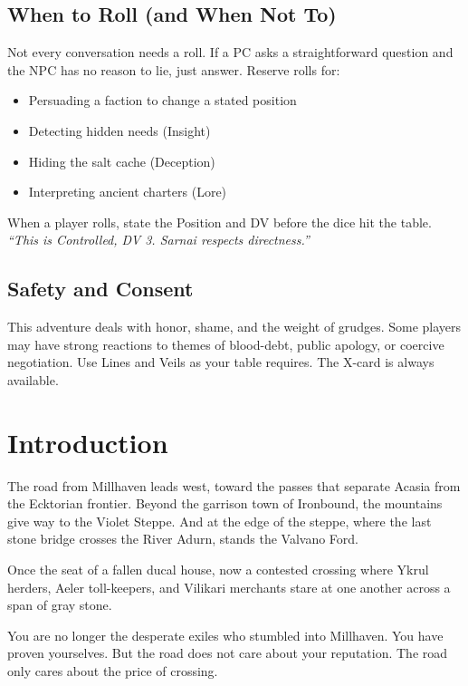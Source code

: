 \documentclass[10pt,twoside]{book}
\begin{document}
\section*{When to Roll (and When Not To)}

Not every conversation needs a roll. If a PC asks a straightforward question and the NPC has no reason to lie, just answer. Reserve rolls for:

\begin{itemize}
\item Persuading a faction to change a stated position
\item Detecting hidden needs (Insight)
\item Hiding the salt cache (Deception)
\item Interpreting ancient charters (Lore)
\end{itemize}

When a player rolls, state the Position and DV before the dice hit the table. \textit{``This is Controlled, DV 3. Sarnai respects directness.''}

\section*{Safety and Consent}

This adventure deals with honor, shame, and the weight of grudges. Some players may have strong reactions to themes of blood-debt, public apology, or coercive negotiation. Use Lines and Veils as your table requires. The X-card is always available.

\chapter*{Introduction}

The road from Millhaven leads west, toward the passes that separate Acasia from the Ecktorian frontier. Beyond the garrison town of Ironbound, the mountains give way to the Violet Steppe. And at the edge of the steppe, where the last stone bridge crosses the River Adurn, stands the Valvano Ford.

Once the seat of a fallen ducal house, now a contested crossing where Ykrul herders, Aeler toll-keepers, and Vilikari merchants stare at one another across a span of gray stone.

You are no longer the desperate exiles who stumbled into Millhaven. You have proven yourselves. But the road does not care about your reputation. The road only cares about the price of crossing.
\end{document}
